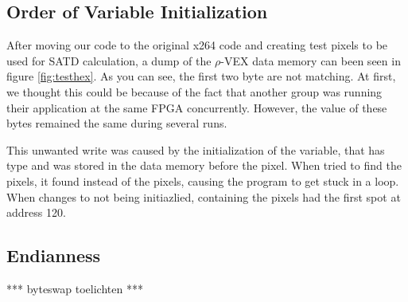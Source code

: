 \subsection{Order of Variable Initialization}

After moving our code to the original x264 code and creating test pixels to be used for SATD calculation, a dump of the $\rho$-VEX data memory can been seen in figure \ref{fig:testhex}. As you can see, the first two byte are not matching. At first, we thought this could be because of the fact that another group was running their application at the same FPGA concurrently. However, the value of these bytes remained the same during several runs. 

This unwanted write was caused by the initialization of the  variable, that has type  and was stored in the data memory before the pixel. When  tried to find the pixels, it found  instead of the pixels, causing the program to get stuck in a loop. When changes  to not being initiazlied,  containing the pixels had the first spot at address 120.

\subsection{Endianness}
*** byteswap toelichten ***